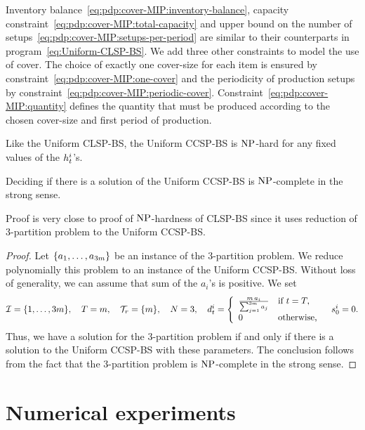 Inventory balance~\eqref{eq:pdp:cover-MIP:inventory-balance}, capacity constraint~\eqref{eq:pdp:cover-MIP:total-capacity} and upper bound on the number of setups~\eqref{eq:pdp:cover-MIP:setups-per-period} are similar to their counterparts in program~\eqref{eq:Uniform-CLSP-BS}.
We add three other constraints to model the use of cover.
The choice of exactly one cover-size for each item is ensured by constraint~\eqref{eq:pdp:cover-MIP:one-cover} and the periodicity of production setups by constraint~\eqref{eq:pdp:cover-MIP:periodic-cover}.
Constraint~\eqref{eq:pdp:cover-MIP:quantity} defines the quantity that must be produced according to the chosen cover-size and first period of production.


\medskip


Like the Uniform CLSP-BS, the Uniform CCSP-BS is $\operatorname{NP}$-hard for any fixed values of the $h_t^i$'s.

\begin{thm}
  Deciding if there is a solution of the Uniform CCSP-BS is $\operatorname{NP}$-complete in the strong sense.
\end{thm}


Proof is very close to proof of $\operatorname{NP}$-hardness of CLSP-BS since it uses reduction of 3-partition problem to the Uniform CCSP-BS.


\begin{proof}
Let $\crbracket{a_1,\ldots,a_{3m}}$ be an instance of the 3-partition problem.
We reduce polynomially this problem to an instance of the Uniform CCSP-BS.
Without loss of generality, we can assume that sum of the $a_i$'s is positive.
We set
\begin{equation}
  \REF=\range[1]{3m}
  ,\quad
  \horizon=m
  ,\quad
  \coverset_r=\crbracket{m}
  ,\quad
  \nbsetups=3
  ,\quad
  \demand_t^i
  =\left\{
  \begin{array}{ll}
  \frac{m\,a_i}{\sum_{j=1}^{3m}a_j} & \mbox{if}\ t=\horizon,
  \\
  0 & \mbox{otherwise,}\end{array}
  \right.
  \quad
  \inventory_0^i=0.
\end{equation}
Thus, we have a solution for the 3-partition problem if and only if there is a solution to the Uniform CCSP-BS with these parameters. The conclusion follows from the fact that the 3-partition problem is $\operatorname{NP}$-complete in the strong sense.
\end{proof}


\section{Numerical experiments}


